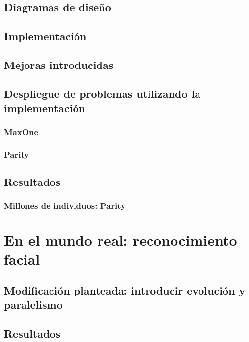 \documentclass{estilos-y-libreria}
\begin{document}
	\section{Diagramas de dise\~no}
		
	\section{Implementaci\'on}
		
	\section{Mejoras introducidas}
		
	\section{Despliegue de problemas utilizando la implementaci\'on}
		
		\subsection{MaxOne}
			
		\subsection{Parity}
			
	\section{Resultados}
			
		\subsection{Millones de individuos: Parity}
				
			
\chapter{En el mundo real: reconocimiento facial}		
	
	\section{Modificación planteada: introducir evolución y paralelismo}
		
	\section{Resultados}
		
\end{document}
